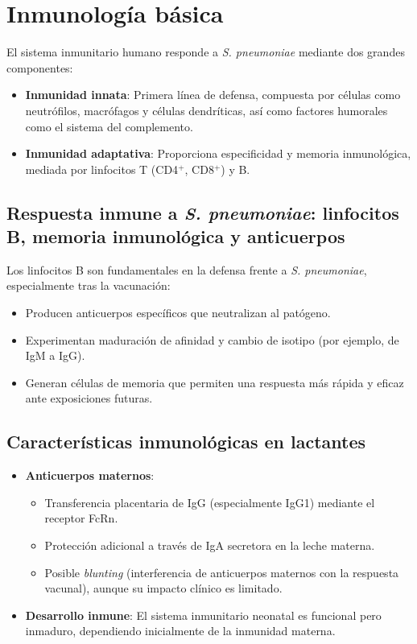 \section{Inmunología básica}

El sistema inmunitario humano responde a \textit{S. pneumoniae} mediante dos grandes componentes:

\begin{itemize}
    \item \textbf{Inmunidad innata}: Primera línea de defensa, compuesta por células como neutrófilos, macrófagos y células dendríticas, así como factores humorales como el sistema del complemento.
    \item \textbf{Inmunidad adaptativa}: Proporciona especificidad y memoria inmunológica, mediada por linfocitos T (CD4$^+$, CD8$^+$) y B.
\end{itemize}

\subsection{Respuesta inmune a \textit{S. pneumoniae}: linfocitos B, memoria inmunológica y anticuerpos}

Los linfocitos B son fundamentales en la defensa frente a \textit{S. pneumoniae}, especialmente tras la vacunación:
\begin{itemize}
    \item Producen anticuerpos específicos que neutralizan al patógeno.
    \item Experimentan maduración de afinidad y cambio de isotipo (por ejemplo, de IgM a IgG).
    \item Generan células de memoria que permiten una respuesta más rápida y eficaz ante exposiciones futuras.
\end{itemize}

\subsection{Características inmunológicas en lactantes}
\begin{itemize}
    \item \textbf{Anticuerpos maternos}: 
    \begin{itemize}
        \item Transferencia placentaria de IgG (especialmente IgG1) mediante el receptor FcRn.
        \item Protección adicional a través de IgA secretora en la leche materna.
        \item Posible \textit{blunting} (interferencia de anticuerpos maternos con la respuesta vacunal), aunque su impacto clínico es limitado.
    \end{itemize}
    \item \textbf{Desarrollo inmune}: El sistema inmunitario neonatal es funcional pero inmaduro, dependiendo inicialmente de la inmunidad materna.
\end{itemize}

